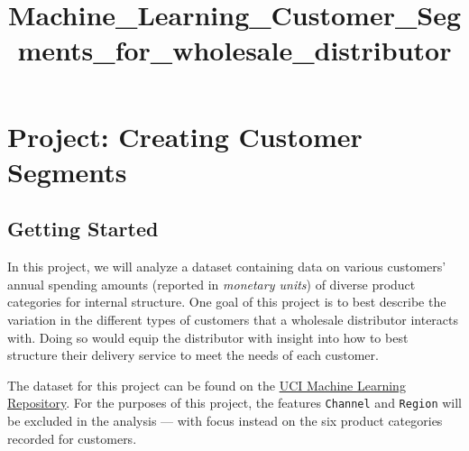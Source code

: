 \documentclass[11pt]{article}
\title{Machine\_Learning\_Customer\_Segments\_for\_wholesale\_distributor}
\begin{document}
    
    
    \maketitle
    
    

    
    \section{Project: Creating Customer
Segments}\label{project-creating-customer-segments}

    \subsection{Getting Started}\label{getting-started}

In this project, we will analyze a dataset containing data on various
customers' annual spending amounts (reported in \emph{monetary units})
of diverse product categories for internal structure. One goal of this
project is to best describe the variation in the different types of
customers that a wholesale distributor interacts with. Doing so would
equip the distributor with insight into how to best structure their
delivery service to meet the needs of each customer.

The dataset for this project can be found on the
\href{https://archive.ics.uci.edu/ml/datasets/Wholesale+customers}{UCI
Machine Learning Repository}. For the purposes of this project, the
features \texttt{\textquotesingle{}Channel\textquotesingle{}} and
\texttt{\textquotesingle{}Region\textquotesingle{}} will be excluded in
the analysis --- with focus instead on the six product categories
recorded for customers.
\end{document}
